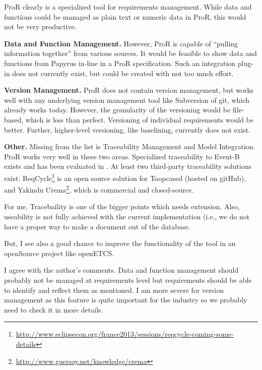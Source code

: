 \begin{author_comment}
ProR clearly is a specialized tool for requirements management.  While data and functions could be managed as plain text or numeric data in ProR, this would not be very productive.

\textbf{Data and Function Management.} However, ProR is capable of ``pulling information together'' from various sources.  It would be feasible to show data and functions from Papyrus in-line in a ProR specification.  Such an integration plug-in does not currently exist, but could be created with not too much effort.

\textbf{Version Management.} ProR does not contain version management, but works well with any underlying version management tool like Subversion of git, which already works today.  However, the granularity of the versioning would be file-based, which is less than perfect.  Versioning of individual requirements would be better.  Further, higher-level versioning, like baselining, currently does not exist.

\textbf{Other.} Missing from the list is Traceability Management and Model Integration.  ProR works very well in these two areas.  Specialized traceability to Event-B exists and has been evaluated in \cite{event_b_benchmark}.  At least two third-party traceability solutions exist: ReqCycle\footnote{\url{http://www.eclipsecon.org/france2013/sessions/reqcycle-coming-some-details}} is an open source solution for Toopcased (hosted on gitHub), and Yakindu Crema\footnote{\url{http://www.guersoy.net/knowledge/crema}}, which is commercial and closed-source.
\end{author_comment}

\begin{assessor1}
For me, Tracebaility is one of the bigger points which needs extension. Also, useability is not fully achieved with the current implementation (i.e., we do not have a proper way to make a document out of the database.

But, I see also a good chance to improve the functionality of the tool in an openSource project like openETCS.

\end{assessor1}

\begin{assessor2}
I agree with the author's comments. Data and function management should probably not be managed at requirements level but requirements should be able to identify and reflect them as mentioned. I am more severe for version management as this feature is quite important for the industry so we probably need to check it in more details.
\end{assessor2}

